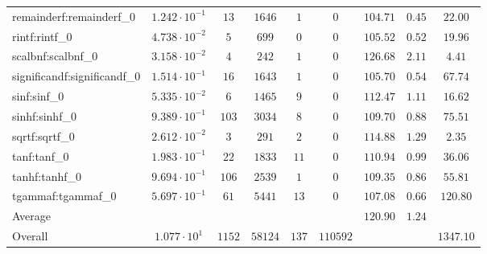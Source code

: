 \begin{tabular}{|l|c|c|c|c|c|c|c|c|}
remainderf:remainderf\_0     & $ 1.242 \cdot 10^{-1} $ & $ 13     $ & $ 1646  $ & $ 1   $ & $ 0      $ & $ 104.71      $ & $ 0.45    $ & $ 22.00   $ \\
rintf:rintf\_0               & $ 4.738 \cdot 10^{-2} $ & $ 5      $ & $ 699   $ & $ 0   $ & $ 0      $ & $ 105.52      $ & $ 0.52    $ & $ 19.96   $ \\
scalbnf:scalbnf\_0           & $ 3.158 \cdot 10^{-2} $ & $ 4      $ & $ 242   $ & $ 1   $ & $ 0      $ & $ 126.68      $ & $ 2.11    $ & $ 4.41    $ \\
significandf:significandf\_0 & $ 1.514 \cdot 10^{-1} $ & $ 16     $ & $ 1643  $ & $ 1   $ & $ 0      $ & $ 105.70      $ & $ 0.54    $ & $ 67.74   $ \\
sinf:sinf\_0                 & $ 5.335 \cdot 10^{-2} $ & $ 6      $ & $ 1465  $ & $ 9   $ & $ 0      $ & $ 112.47      $ & $ 1.11    $ & $ 16.62   $ \\
sinhf:sinhf\_0               & $ 9.389 \cdot 10^{-1} $ & $ 103    $ & $ 3034  $ & $ 8   $ & $ 0      $ & $ 109.70      $ & $ 0.88    $ & $ 75.51   $ \\
sqrtf:sqrtf\_0               & $ 2.612 \cdot 10^{-2} $ & $ 3      $ & $ 291   $ & $ 2   $ & $ 0      $ & $ 114.88      $ & $ 1.29    $ & $ 2.35    $ \\
tanf:tanf\_0                 & $ 1.983 \cdot 10^{-1} $ & $ 22     $ & $ 1833  $ & $ 11  $ & $ 0      $ & $ 110.94      $ & $ 0.99    $ & $ 36.06   $ \\
tanhf:tanhf\_0               & $ 9.694 \cdot 10^{-1} $ & $ 106    $ & $ 2539  $ & $ 1   $ & $ 0      $ & $ 109.35      $ & $ 0.86    $ & $ 55.81   $ \\
tgammaf:tgammaf\_0           & $ 5.697 \cdot 10^{-1} $ & $ 61     $ & $ 5441  $ & $ 13  $ & $ 0      $ & $ 107.08      $ & $ 0.66    $ & $ 120.80  $ \\
\hline
Average                      & $                     $ & $        $ & $       $ & $     $ & $        $ & $ 120.90      $ & $ 1.24    $ & $         $ \\
\hline
Overall                      & $ 1.077 \cdot 10^{1}  $ & $ 1152   $ & $ 58124 $ & $ 137 $ & $ 110592 $ & $             $ & $         $ & $ 1347.10 $ \\
\hline
\end{tabular}
